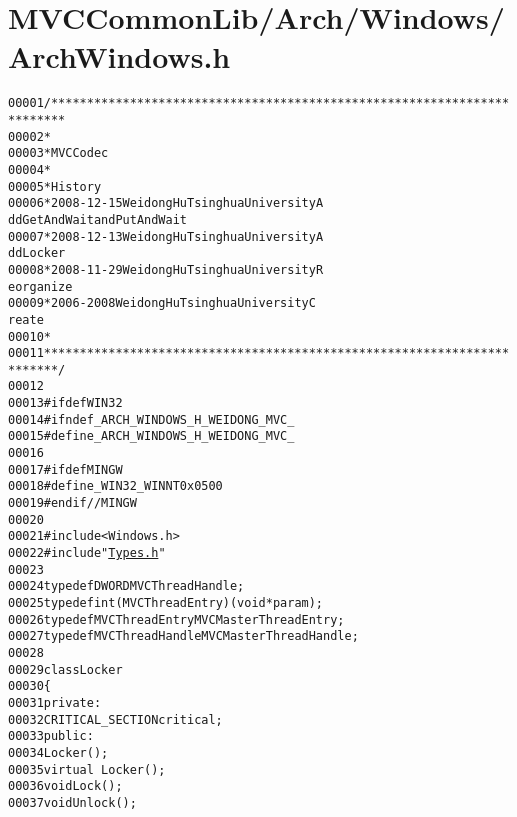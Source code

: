 \hypertarget{_arch_windows_8h_source}{
\section{MVCCommonLib/Arch/Windows/ArchWindows.h}
}


\begin{footnotesize}\begin{alltt}
00001 \textcolor{comment}{/************************************************************************}
00002 \textcolor{comment}{ *}
00003 \textcolor{comment}{ * MVC Codec}
00004 \textcolor{comment}{ * }
00005 \textcolor{comment}{ * History}
00006 \textcolor{comment}{ * 2008-12-15           Weidong Hu              Tsinghua University             A
      dd GetAndWait and PutAndWait}
00007 \textcolor{comment}{ * 2008-12-13           Weidong Hu              Tsinghua University             A
      dd Locker}
00008 \textcolor{comment}{ * 2008-11-29           Weidong Hu              Tsinghua University             R
      eorganize}
00009 \textcolor{comment}{ * 2006-2008            Weidong Hu              Tsinghua University             C
      reate}
00010 \textcolor{comment}{ * }
00011 \textcolor{comment}{ ************************************************************************/}
00012 
00013 \textcolor{preprocessor}{#ifdef WIN32}
00014 \textcolor{preprocessor}{}\textcolor{preprocessor}{#ifndef \_ARCH\_WINDOWS\_H\_WEIDONG\_MVC\_}
00015 \textcolor{preprocessor}{}\textcolor{preprocessor}{#define \_ARCH\_WINDOWS\_H\_WEIDONG\_MVC\_}
00016 \textcolor{preprocessor}{}
00017 \textcolor{preprocessor}{#ifdef MINGW}
00018 \textcolor{preprocessor}{}\textcolor{preprocessor}{#define \_WIN32\_WINNT 0x0500}
00019 \textcolor{preprocessor}{}\textcolor{preprocessor}{#endif //MINGW}
00020 \textcolor{preprocessor}{}
00021 \textcolor{preprocessor}{#include <Windows.h>}
00022 \textcolor{preprocessor}{#include "\hyperlink{_types_8h}{Types.h}"}
00023 
00024 \textcolor{keyword}{typedef} DWORD MVCThreadHandle;
00025 \textcolor{keyword}{typedef} int (MVCThreadEntry)(\textcolor{keywordtype}{void} *param);
00026 \textcolor{keyword}{typedef} MVCThreadEntry MVCMasterThreadEntry;
00027 \textcolor{keyword}{typedef} MVCThreadHandle MVCMasterThreadHandle;
00028 
00029 \textcolor{keyword}{class }Locker
00030 \{
00031 \textcolor{keyword}{private}:
00032         CRITICAL\_SECTION critical;
00033 \textcolor{keyword}{public}:
00034         Locker();
00035         \textcolor{keyword}{virtual} ~Locker();
00036         \textcolor{keywordtype}{void} Lock();
00037         \textcolor{keywordtype}{void} Unlock();

\end{alltt}
\end{footnotesize}
